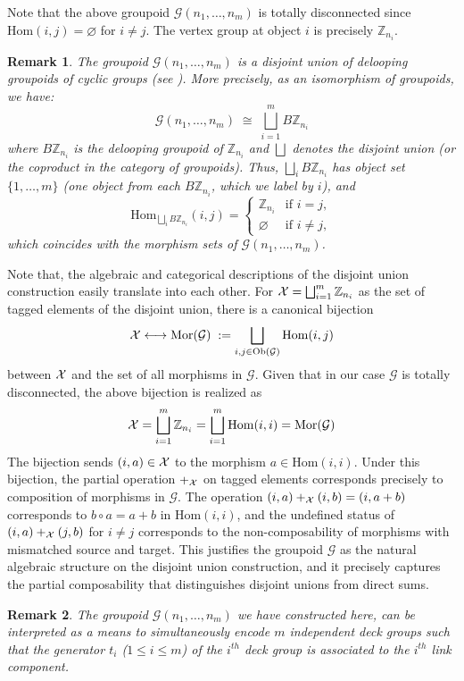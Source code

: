 \documentclass[a4paper,12pt]{article}
\newtheorem{remark}{Remark}[section]
\newcommand{\Z}{\mathbb{Z}}
\newcommand{\calG}{\mathcal{G}}
\newcommand{\Ob}{\mathrm{Ob}}
\newcommand{\Hom}{\mathrm{Hom}}
\newcommand{\Mor}{\mathrm{Mor}}
\begin{document}
Note that the above groupoid $\calG(n_1, \ldots, n_m)$ is totally disconnected since
$\Hom(i,j) = \varnothing$ for $i \neq j$. The vertex group at object
$i$ is precisely $\Z_{n_i}$.

\begin{remark}  
The groupoid $\calG(n_1, \ldots, n_m)$ is a disjoint union of delooping   groupoids of cyclic groups (see \cite{nlab:groupoid}). More precisely, as an isomorphism of groupoids, we have:   
\[
  \calG(n_1, \ldots, n_m) \;\cong\; \bigsqcup_{i=1}^{m} B\Z_{n_i}  
\]
where $B\Z_{n_i}$ is the delooping groupoid of $\Z_{n_i}$ and
$\bigsqcup$ denotes the disjoint union (or the coproduct in the category of
groupoids).  Thus, $\bigsqcup_i B\Z_{n_i}$ has object  set $\{1, \ldots, m\}$ (one object from each $B\Z_{n_i}$, which we
label by $i$), and
\[
  \Hom_{\bigsqcup_i B\Z_{n_i}}(i,j) =
  \begin{cases}
    \Z_{n_i} & \text{if } i = j, \\
    \varnothing & \text{if } i \neq j,
  \end{cases}
\]
which coincides with the morphism sets of $\calG(n_1, \ldots, n_m)$.  
\end{remark}


Note that, the algebraic and categorical descriptions of the disjoint union construction easily translate into each other.  
For ${\cal X} = \bigsqcup_{i=1}^{m} \Z_{n_i}$ as the set of tagged elements of the  disjoint union, there is a canonical bijection
\[
  {\cal X} \longleftrightarrow \Mor(\calG) \; :=  \bigsqcup_{i,j \in \Ob(\calG)} \Hom(i,j)
\]
between ${\cal X}$ and the set of all morphisms in $\calG$. Given that  in our case $\calG$ is totally disconnected, the above bijection is realized as 
\[
{\cal X} =  \bigsqcup_{i=1}^{m} \Z_{n_i}  = \bigsqcup_{i=1}^{m} \Hom(i,i) = \Mor(\calG)  
\]
The bijection sends $(i,a) \in {\cal X}$ to the morphism $a \in \Hom(i,i)$.  Under this bijection, the partial operation $+_{\cal X}$ on tagged elements  corresponds precisely to composition of morphisms in 
$\calG$. The operation $(i,a) +_{\cal X} (i,b) = (i, a+b)$ corresponds to
$b \circ a = a + b$ in $\Hom(i,i)$, and the undefined status of
$(i,a) +_{\cal X} (j,b)$ for $i \neq j$ corresponds to the
non-composability of morphisms with mismatched source and target.  This  justifies the groupoid $\calG$ as the natural
algebraic structure on the disjoint union  construction, and it 
precisely captures the partial composability that distinguishes
disjoint unions from direct sums.


\begin{remark}
The groupoid $\calG(n_1, \ldots, n_m)$  we have constructed here, can be interpreted as a means to simultaneously encode $m$ independent deck groups such that the generator $t_i$ ($1 \leq i \leq m$) of the $i^{th}$ deck group is associated to the $i^{th}$ link component.   
\end{remark}
\end{document}
